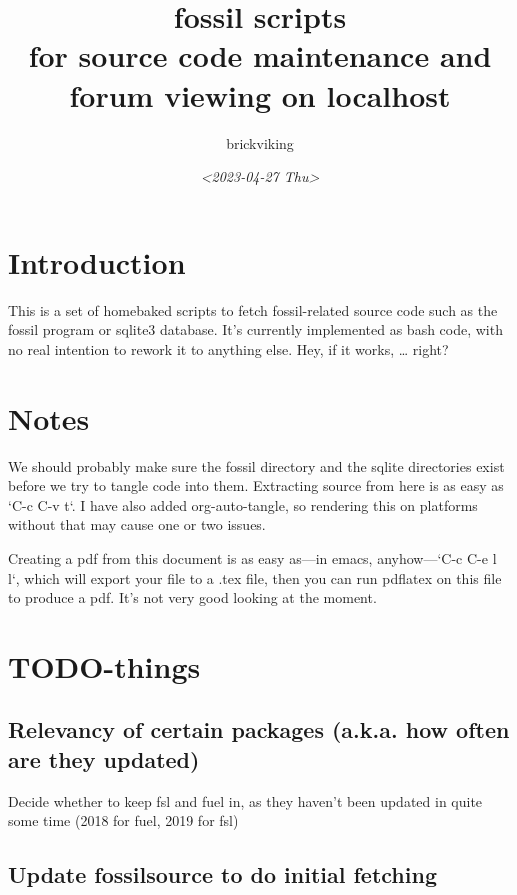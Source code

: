 \documentclass[11pt]{article}
\author{brickviking}
\date{\textit{<2023-04-27 Thu>}}
\title{fossil scripts\\\medskip
\large for source code maintenance and forum viewing on localhost}
\begin{document}
\maketitle
\setcounter{tocdepth}{2}
\tableofcontents



\section*{Introduction}
\label{sec:org90b1a79}

This is a set of homebaked scripts to fetch fossil-related source code such as the fossil program
or sqlite3 database. It's currently implemented as bash code, with no real intention to rework it to anything
else. Hey, if it works, \ldots{} right?

\section*{Notes}
\label{sec:orgade2b7b}

We should probably make sure the fossil directory and the sqlite directories exist before we
try to tangle code into them. Extracting source from here is as easy as `C-c C-v t`.
I have also added org-auto-tangle, so rendering this on platforms without that may cause one or two issues.

Creating a pdf from this document is as easy as—in emacs, anyhow—`C-c C-e l l`, which will export your
file to a .tex file, then you can run pdflatex on this file to produce a pdf. It's not very good looking
at the moment.

\section*{TODO-things}
\label{sec:org564fe80}

\subsection*{Relevancy of certain packages (a.k.a. how often are they updated)}
\label{sec:org9112049}

Decide whether to keep fsl and fuel in, as they haven't been updated in quite some time (2018 for fuel,
2019 for fsl)

\subsection*{Update fossilsource to do initial fetching}
\label{sec:org4503f09}
\end{document}

